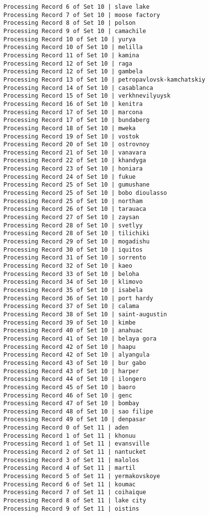 \documentclass[11pt]{article}
\begin{document}
\begin{Verbatim}[commandchars=\\\{\}]
Processing Record 6 of Set 10 | slave lake
Processing Record 7 of Set 10 | moose factory
Processing Record 8 of Set 10 | polson
Processing Record 9 of Set 10 | camachile
Processing Record 10 of Set 10 | yurya
Processing Record 10 of Set 10 | melilla
Processing Record 11 of Set 10 | kamina
Processing Record 12 of Set 10 | raga
Processing Record 12 of Set 10 | gambela
Processing Record 13 of Set 10 | petropavlovsk-kamchatskiy
Processing Record 14 of Set 10 | casablanca
Processing Record 15 of Set 10 | verkhnevilyuysk
Processing Record 16 of Set 10 | kenitra
Processing Record 17 of Set 10 | marcona
Processing Record 17 of Set 10 | bundaberg
Processing Record 18 of Set 10 | mweka
Processing Record 19 of Set 10 | vostok
Processing Record 20 of Set 10 | ostrovnoy
Processing Record 21 of Set 10 | vanavara
Processing Record 22 of Set 10 | khandyga
Processing Record 23 of Set 10 | honiara
Processing Record 24 of Set 10 | fukue
Processing Record 25 of Set 10 | gumushane
Processing Record 25 of Set 10 | bobo dioulasso
Processing Record 25 of Set 10 | northam
Processing Record 26 of Set 10 | tarauaca
Processing Record 27 of Set 10 | zaysan
Processing Record 28 of Set 10 | svetlyy
Processing Record 28 of Set 10 | tilichiki
Processing Record 29 of Set 10 | mogadishu
Processing Record 30 of Set 10 | iquitos
Processing Record 31 of Set 10 | sorrento
Processing Record 32 of Set 10 | kaeo
Processing Record 33 of Set 10 | beloha
Processing Record 34 of Set 10 | klimovo
Processing Record 35 of Set 10 | isabela
Processing Record 36 of Set 10 | port hardy
Processing Record 37 of Set 10 | calama
Processing Record 38 of Set 10 | saint-augustin
Processing Record 39 of Set 10 | kimbe
Processing Record 40 of Set 10 | anahuac
Processing Record 41 of Set 10 | belaya gora
Processing Record 42 of Set 10 | haapu
Processing Record 42 of Set 10 | alyangula
Processing Record 43 of Set 10 | bur gabo
Processing Record 43 of Set 10 | harper
Processing Record 44 of Set 10 | ilongero
Processing Record 45 of Set 10 | baoro
Processing Record 46 of Set 10 | genc
Processing Record 47 of Set 10 | bombay
Processing Record 48 of Set 10 | sao filipe
Processing Record 49 of Set 10 | denpasar
Processing Record 0 of Set 11 | aden
Processing Record 1 of Set 11 | khonuu
Processing Record 1 of Set 11 | evansville
Processing Record 2 of Set 11 | nantucket
Processing Record 3 of Set 11 | malolos
Processing Record 4 of Set 11 | martil
Processing Record 5 of Set 11 | yermakovskoye
Processing Record 6 of Set 11 | koumac
Processing Record 7 of Set 11 | coihaique
Processing Record 8 of Set 11 | lake city
Processing Record 9 of Set 11 | oistins

\end{Verbatim}
\end{document}
